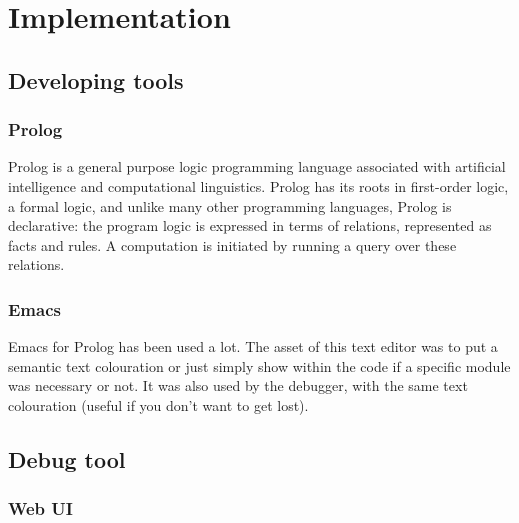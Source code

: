 \documentclass{article}
\begin{document}
\section{Implementation}
	\subsection{Developing tools}
		\subsubsection{Prolog}
			Prolog is a general purpose logic programming language associated with artificial intelligence and computational linguistics.
			Prolog has its roots in first-order logic, a formal logic, and unlike many other programming languages,
			Prolog is declarative: the program logic is expressed in terms of relations, represented as facts and rules.
			A computation is initiated by running a query over these relations.
		\subsubsection{Emacs}
			Emacs for Prolog has been used a lot.
			The asset of this text editor was to put a semantic text colouration
			or just simply show within the code if a specific module was necessary or not.
			It was also used by the debugger, with the same text colouration (useful if you don't want to get lost).
	\subsection{Debug tool}
		\subsubsection{Web UI}
\end{document}
